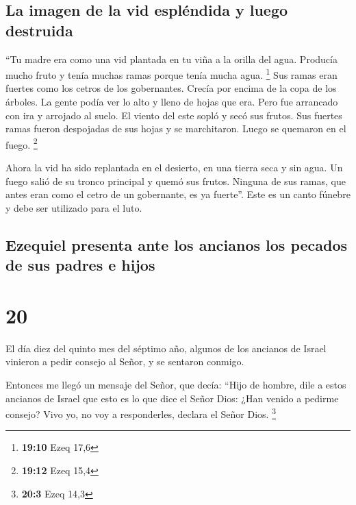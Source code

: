 \hypertarget{la-imagen-de-la-vid-espluxe9ndida-y-luego-destruida}{%
\subsection{La imagen de la vid espléndida y luego
destruida}\label{la-imagen-de-la-vid-espluxe9ndida-y-luego-destruida}}

 ``Tu madre era como una vid plantada en tu viña a la
orilla del agua. Producía mucho fruto y tenía muchas ramas porque tenía
mucha agua. \footnote{\textbf{19:10} Ezeq 17,6}  Sus
ramas eran fuertes como los cetros de los gobernantes. Crecía por encima
de la copa de los árboles. La gente podía ver lo alto y lleno de hojas
que era.  Pero fue arrancado con ira y arrojado al suelo.
El viento del este sopló y secó sus frutos. Sus fuertes ramas fueron
despojadas de sus hojas y se marchitaron. Luego se quemaron en el fuego.
\footnote{\textbf{19:12} Ezeq 15,4}

 Ahora la vid ha sido replantada en el desierto, en una
tierra seca y sin agua.  Un fuego salió de su tronco
principal y quemó sus frutos. Ninguna de sus ramas, que antes eran como
el cetro de un gobernante, es ya fuerte''. Este es un canto fúnebre y
debe ser utilizado para el luto.

\hypertarget{ezequiel-presenta-ante-los-ancianos-los-pecados-de-sus-padres-e-hijos}{%
\subsection{Ezequiel presenta ante los ancianos los pecados de sus
padres e
hijos}\label{ezequiel-presenta-ante-los-ancianos-los-pecados-de-sus-padres-e-hijos}}

\hypertarget{section-19}{%
\section{20}\label{section-19}}

 El día diez del quinto mes del séptimo año, algunos de
los ancianos de Israel vinieron a pedir consejo al Señor, y se sentaron
conmigo.

 Entonces me llegó un mensaje del Señor, que decía:
 ``Hijo de hombre, dile a estos ancianos de Israel que
esto es lo que dice el Señor Dios: ¿Han venido a pedirme consejo? Vivo
yo, no voy a responderles, declara el Señor Dios. \footnote{\textbf{20:3}
  Ezeq 14,3}

